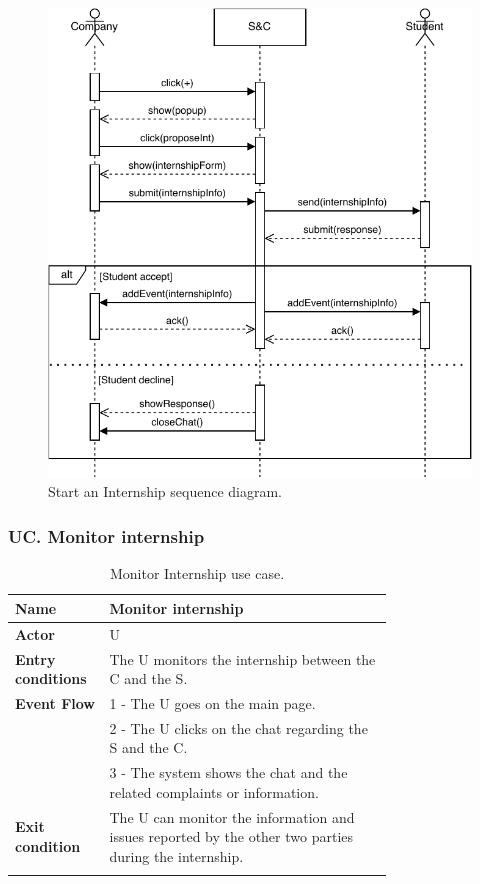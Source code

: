 \begin{figure}[H]
    \begin{center}
        \includegraphics[width=0.9\linewidth]{Images/SequenceDiagram/StartInternSD.pdf}
        \caption{Start an Internship sequence diagram.}
        \label{fig:start_internship_seqdiag}%
    \end{center}
\end{figure}

\newpage

\subsubsection*{UC\cuc . Monitor internship}
\begin{center}
    \begin{longtable}{|l|p{0.75\linewidth}|}
        \hline
        \textbf{Name}               & Monitor internship\\
        \hline
        \textbf{Actor}              & U\\
        \hline
        \textbf{Entry conditions}   & The U monitors the internship between the C and the S.\\
        \hline
        \textbf{Event Flow}         & 1 - The U goes on the main page. \\
        & 2 - The U clicks on the chat regarding the S and the C. \\
        & 3 - The system shows the chat and the related complaints or information. \\
        \hline
        \textbf{Exit condition}   & The U can monitor the information and issues reported by the other two parties during the internship. \\       
        \hline
        \caption{Monitor Internship use case.}
        \label{tab: monitor_internship_use_case}
    \end{longtable}
\end{center}


